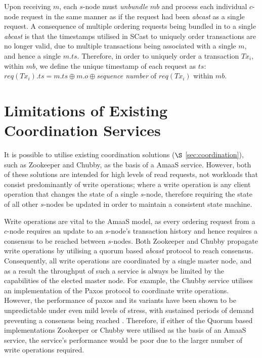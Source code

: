     Upon receiving $m$, each $s$-node must \emph{unbundle} $mb$ and process each individual $c$-node request in the same manner as if the request had been \emph{abcast} as a single request.  A consequence of multiple ordering requests being bundled in to a single \emph{abcast} is that the timestamps utilised in \textsf{SCast} to uniquely order transactions are no longer valid, due to multiple transactions being associated with a single $m$, and hence a single $m.ts$.  Therefore, in order to uniquely order a transaction $Tx_i$, within $mb$, we define the unique timestamp of each request as $ts$: $req(Tx_i).ts = m.ts\oplus m.o \oplus$\emph{sequence number} of $req(Tx_i)$ within $mb$.  

\section{Limitations of Existing Coordination Services}\label{sec:limitations_existing_coordination}
It is possible to utilise existing coordination solutions ($\S$ \ref{sec:coordination}), such as Zookeeper\citep{Hunt:2010:ZWC:1855840.1855851} and Chubby\citep{Burrows:2006:CLS:1298455.1298487}, as the basis of a \textsf{AmaaS} service.  However, both of these solutions are intended for high levels of read requests, not workloads that consist predominantly of write operations; where a write operation is any client operation that changes the state of a single $s$-node, therefore requiring the state of all other $s$-nodes be updated in order to maintain a consistent state machine.  

Write operations are vital to the \textsf{AmaaS} model, as every ordering request from a $c$-node requires an update to an $s$-node's transaction history and hence requires a consensus to be reached between $s$-nodes.  Both Zookeeper and Chubby propagate write operations by utilising a quorum based \emph{abcast} protocol to reach consensus.  Consequently, all write operations are coordinated by a single master node, and as a result the throughput of such a service is always be limited by the capabilities of the elected master node.  For example, the Chubby service utilises an implementation of the Paxos protocol to coordinate write operations.  However, the performance of paxos and its variants have been shown to be unpredictable under even mild levels of stress, with sustained periods of demand preventing a consensus being reached \citep{DBLP:journals/corr/MarandiBPB14}.  Therefore, if either of the Quorum based implementations Zookeeper or Chubby were utilised as the basis of an \textsf{AmaaS} service, the service's performance would be poor due to the larger number of write operations required.  

